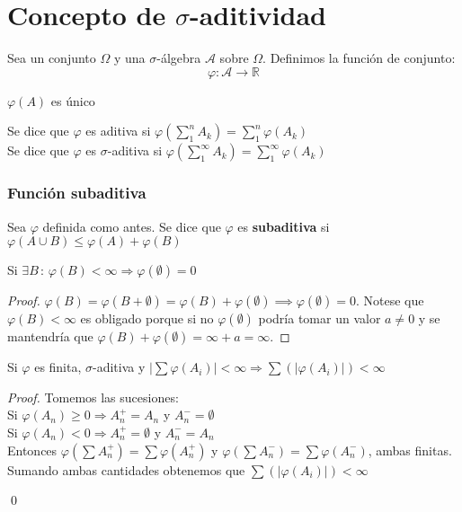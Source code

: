 \section{Concepto de $\sigma$-aditividad}
Sea un conjunto $\Omega$ y una $\sigma$-álgebra $\mathcal{A}$ sobre $\Omega$. Definimos la función de conjunto:
$$\varphi : \mathcal{A} \rightarrow \mathbb{R}$$
\begin{center}
$\varphi (A)$ es único\\
\end{center}
Se dice que $\varphi$ es aditiva si $\varphi\left(\displaystyle\sum_{1}^{n}A_k\right)=\displaystyle\sum_1^n\varphi(A_k)$\\
Se dice que $\varphi$ es $\sigma$-aditiva si $\varphi\left(\displaystyle\sum_1^\infty A_k\right)=\displaystyle\sum_1^\infty \varphi(A_k)$


\subsubsection{Función subaditiva}
Sea $\varphi$ definida como antes. Se dice que $\varphi$ es \textbf{subaditiva} si $\varphi(A \cup B) \leq \varphi(A) + \varphi(B)$

\begin{lemma}
Si $\exists B\, : \, \varphi(B)<\infty \Rightarrow \varphi(\emptyset)=0$
\end{lemma}
\begin{proof}
  $\varphi(B) =  \varphi(B+\emptyset) = \varphi(B) + \varphi(\emptyset)\implies \varphi(\emptyset) = 0$. Notese que $\varphi(B)<\infty$ es obligado porque si no $\varphi(\emptyset)$ podría tomar un valor $a \neq 0$ y se mantendría que  $\varphi(B) + \varphi(\emptyset) = \infty + a = \infty$.
\end{proof}


\begin{theorem}
Si $\varphi$ es finita, $\sigma$-aditiva y $\displaystyle|\sum\varphi(A_i)|<\infty\Rightarrow\displaystyle\sum(\vert \varphi(A_i)\vert)<\infty$
\end{theorem}
\begin{proof}
Tomemos las sucesiones: \\
Si $\varphi(A_n)\geq 0 \Longrightarrow A_n^{+}=A_n$ y $A_n^{-}=\emptyset$\\
Si $\varphi(A_n)<0 \Longrightarrow A_n^{+}=\emptyset$ y $A_n^{-}=A_n$\\
Entonces $\varphi(\displaystyle\sum A_n^{+})=\displaystyle\sum\varphi(A_n^{+})$ y $\varphi(\displaystyle\sum A_n^{-})=\displaystyle\sum\varphi(A_n^{-})$, ambas finitas. Sumando ambas cantidades obtenemos que $\displaystyle\sum(\vert \varphi(A_i)\vert)<\infty$

\qed
\end{proof}

